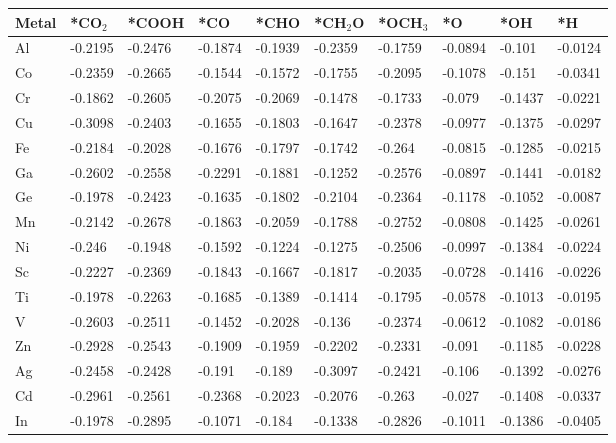 \begin{table}[h]
  \centering
  {\fontsize{6}{12}\selectfont
  \begin{tabular}{*{10}{l}}
      \hline
      Metal & *CO$_2$ & *COOH& *CO     & *CHO    & *CH$_2$O& *OCH$_3$& *O      & *OH     & *H      \\
      \hline
      Al & -0.2195 & -0.2476 & -0.1874 & -0.1939 & -0.2359 & -0.1759 & -0.0894 & -0.101  & -0.0124 \\
      Co & -0.2359 & -0.2665 & -0.1544 & -0.1572 & -0.1755 & -0.2095 & -0.1078 & -0.151  & -0.0341 \\
      Cr & -0.1862 & -0.2605 & -0.2075 & -0.2069 & -0.1478 & -0.1733 & -0.079  & -0.1437 & -0.0221 \\
      Cu & -0.3098 & -0.2403 & -0.1655 & -0.1803 & -0.1647 & -0.2378 & -0.0977 & -0.1375 & -0.0297 \\
      Fe & -0.2184 & -0.2028 & -0.1676 & -0.1797 & -0.1742 & -0.264  & -0.0815 & -0.1285 & -0.0215 \\
      Ga & -0.2602 & -0.2558 & -0.2291 & -0.1881 & -0.1252 & -0.2576 & -0.0897 & -0.1441 & -0.0182 \\
      Ge & -0.1978 & -0.2423 & -0.1635 & -0.1802 & -0.2104 & -0.2364 & -0.1178 & -0.1052 & -0.0087 \\
      Mn & -0.2142 & -0.2678 & -0.1863 & -0.2059 & -0.1788 & -0.2752 & -0.0808 & -0.1425 & -0.0261 \\
      Ni & -0.246  & -0.1948 & -0.1592 & -0.1224 & -0.1275 & -0.2506 & -0.0997 & -0.1384 & -0.0224 \\
      Sc & -0.2227 & -0.2369 & -0.1843 & -0.1667 & -0.1817 & -0.2035 & -0.0728 & -0.1416 & -0.0226 \\
      Ti & -0.1978 & -0.2263 & -0.1685 & -0.1389 & -0.1414 & -0.1795 & -0.0578 & -0.1013 & -0.0195 \\
      V  & -0.2603 & -0.2511 & -0.1452 & -0.2028 & -0.136  & -0.2374 & -0.0612 & -0.1082 & -0.0186 \\
      Zn & -0.2928 & -0.2543 & -0.1909 & -0.1959 & -0.2202 & -0.2331 & -0.091  & -0.1185 & -0.0228 \\
      Ag & -0.2458 & -0.2428 & -0.191  & -0.189  & -0.3097 & -0.2421 & -0.106  & -0.1392 & -0.0276 \\
      Cd & -0.2961 & -0.2561 & -0.2368 & -0.2023 & -0.2076 & -0.263  & -0.027  & -0.1408 & -0.0337 \\
      In & -0.1978 & -0.2895 & -0.1071 & -0.184  & -0.1338 & -0.2826 & -0.1011 & -0.1386 & -0.0405 \\

\end{tabular}}
\end{table}
